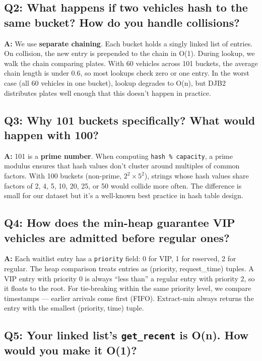 \documentclass[12pt, a4paper]{article}
\begin{document}
\subsection{Q2: What happens if two vehicles hash to the same bucket? How do you handle collisions?}

\textbf{A:} We use \textbf{separate chaining}. Each bucket holds a singly linked list of entries. On collision, the new entry is prepended to the chain in O(1). During lookup, we walk the chain comparing plates. With 60 vehicles across 101 buckets, the average chain length is under 0.6, so most lookups check zero or one entry. In the worst case (all 60 vehicles in one bucket), lookup degrades to O(n), but DJB2 distributes plates well enough that this doesn't happen in practice.

\subsection{Q3: Why 101 buckets specifically? What would happen with 100?}

\textbf{A:} 101 is a \textbf{prime number}. When computing \texttt{hash \% capacity}, a prime modulus ensures that hash values don't cluster around multiples of common factors. With 100 buckets (non-prime, $2^2 \times 5^2$), strings whose hash values share factors of 2, 4, 5, 10, 20, 25, or 50 would collide more often. The difference is small for our dataset but it's a well-known best practice in hash table design.

\subsection{Q4: How does the min-heap guarantee VIP vehicles are admitted before regular ones?}

\textbf{A:} Each waitlist entry has a \texttt{priority} field: 0 for VIP, 1 for reserved, 2 for regular. The heap comparison treats entries as (priority, request\_time) tuples. A VIP entry with priority 0 is always ``less than'' a regular entry with priority 2, so it floats to the root. For tie-breaking within the same priority level, we compare timestamps --- earlier arrivals come first (FIFO). Extract-min always returns the entry with the smallest (priority, time) tuple.

\subsection{Q5: Your linked list's \texttt{get\_recent} is O(n). How would you make it O(1)?}
\end{document}
